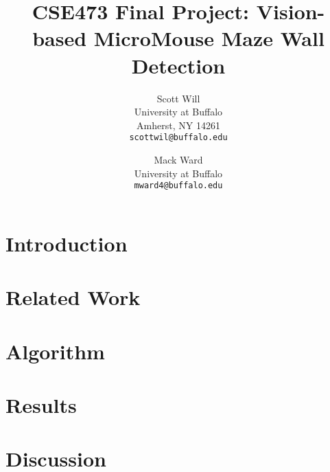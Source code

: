\documentclass[10pt,twocolumn,letterpaper]{article}
\begin{document}
\title{CSE473 Final Project: Vision-based MicroMouse Maze Wall Detection}

\author{Scott Will\\
University at Buffalo\\
Amherst, NY 14261\\
{\tt\small scottwil@buffalo.edu}
\and
Mack Ward\\
University at Buffalo\\
{\tt\small mward4@buffalo.edu}
}

\maketitle

\begin{abstract}
\end{abstract}

\section{Introduction}

\section{Related Work}
\section{Algorithm}
\section{Results}
\section{Discussion}
{\small


}
\end{document}
